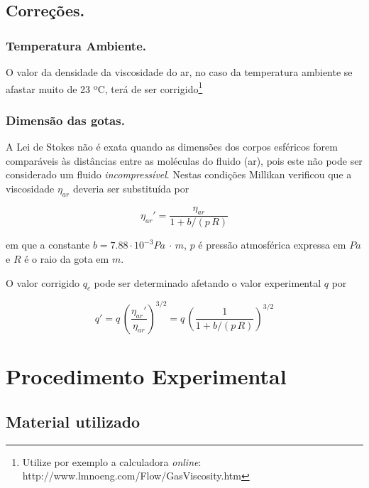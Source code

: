 \documentclass[a4paper,twoside,12pt]{article}      %
\begin{document}
\subsection{\sf Correções.}
\subsubsection{\sf Temperatura Ambiente.}

O valor da densidade da viscosidade do ar, no caso da temperatura ambiente se afastar muito de 23 ºC, terá de ser corrigido\footnote{Utilize por exemplo a calculadora \emph{online}: http://www.lmnoeng.com/Flow/GasViscosity.htm}

\subsubsection{\sf Dimensão das gotas.}

A Lei de Stokes não é exata quando as dimensões dos corpos esféricos forem comparáveis às distâncias entre as moléculas do fluido (ar), pois este não pode ser considerado um fluido \emph{incompressível}.
Nestas condições Millikan verificou que a viscosidade $\eta_{ar}$ deveria ser substituída por

\begin{equation}
	\label{eq:correcao}
	\eta_{ar}' = \frac{\eta_{ar}}{1 + b/(p\,R)}  
\end{equation}

em que a constante $b=7.88\cdot 10^{-3}Pa~\cdot \,m$, 
$p$ é pressão atmosférica expressa em $Pa$ e $R$ é o raio da gota em $m$.

O valor corrigido $q_c$ pode ser determinado afetando o valor experimental $q$ por

\begin{equation}
	\label{eq:correcao1}
	q ' = q\, \left(\frac{\eta_{ar}'}{\eta_{ar}}\right)^{3/2}  =q\, \left(\frac{1}{1 + b/(p\,R)}\right)^{3/2}  
\end{equation}

\newpage
\section{\sf Procedimento Experimental}



\subsection{\sf Material utilizado}
\end{document}
